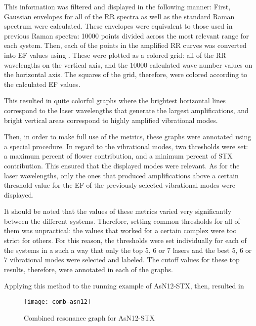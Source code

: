 This information was filtered and displayed in the following manner:
First, Gaussian envelopes for all of the RR spectra as well as the standard Raman spectrum were calculated.
These envelopes were equivalent to those used in previous Raman spectra: \num{10000} points divided across the most relevant range for each system.
Then, each of the points in the amplified RR curves was converted into EF values using .
These were plotted as a colored grid: all of the RR wavelengths on the vertical axis, and the \num{10000} calculated wave number values on the horizontal axis.
The squares of the grid, therefore, were colored according to the calculated EF values.

This resulted in quite colorful graphs where the brightest horizontal lines correspond to the laser wavelengths that generate the largest amplifications, and bright vertical areas correspond to highly amplified vibrational modes.

Then, in order to make full use of the metrics, these graphs were annotated using a special procedure.
In regard to the vibrational modes, two thresholds were set: a maximum percent of flower contribution, and a minimum percent of STX contribution.
This ensured that the displayed modes were relevant.
As for the laser wavelengths, only the ones that produced amplifications above a certain threshold value for the EF of the previously selected vibrational modes were displayed.

It should be noted that the values of these metrics varied very significantly between the different systems.
Therefore, setting common thresholds for all of them was unpractical: the values that worked for a certain complex were too strict for others.
For this reason, the thresholds were set individually for each of the systems in a such a way that only the top 5, 6 or 7 lasers and the best 5, 6 or 7 vibrational modes were selected and labeled.
The cutoff values for these top results, therefore, were annotated in each of the graphs.

Applying this method to the running example of AsN12-STX, then, resulted in 

\begin{figure}
    \texttt{[image: comb-asn12]}
    \caption[Combined resonance graph for AsN12-STX]{Combined resonance graph for AsN12-STX}
\end{figure}

